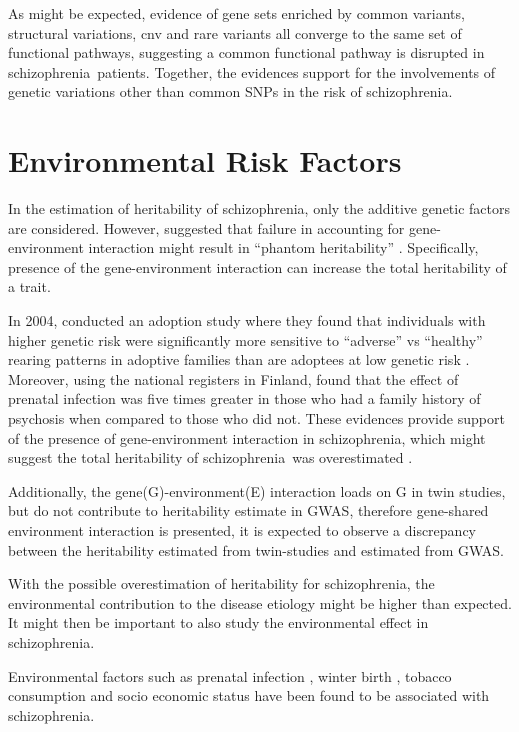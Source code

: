 \documentclass[12pt]{scrbook}
\newcommand*{\scz}{schizophrenia}
\begin{document}
As might be expected, evidence of gene sets enriched by common variants, structural variations, \gls{cnv} and rare variants all converge to the same set of functional pathways, suggesting a common functional pathway is disrupted in \scz\ patients.
Together, the evidences support for the involvements of genetic variations other than common \glspl{SNP} in the risk of \scz.

\section{Environmental Risk Factors}
In the estimation of heritability of \scz, only the additive genetic factors are considered. 
However, \citet{zuk2012mystery} suggested that failure in accounting for gene-environment interaction might result in ``phantom heritability'' \citep{zuk2012mystery}.
Specifically, presence of the gene-environment interaction can increase the total heritability of a trait.

In 2004, \citet{Tienari2004} conducted an adoption study where they found that individuals with higher genetic risk were significantly more sensitive to ``adverse'' vs ``healthy'' rearing patterns in adoptive families than are adoptees at low genetic risk \citep{Tienari2004}.
Moreover, using the national registers in Finland, \citet{Clarke2009} found that the effect of prenatal infection was five times greater in those who had a family history of psychosis when compared to those who did not. 
These evidences provide support of the presence of gene-environment interaction in \scz, which might suggest the total heritability of \scz\ was overestimated \citep{zuk2012mystery}.

Additionally, the gene(G)-environment(E) interaction loads on G in twin studies, but do not contribute to heritability estimate in \gls{GWAS}, therefore gene-shared environment interaction is presented, it is expected to observe a discrepancy between the heritability estimated from twin-studies and estimated from \gls{GWAS}.

With the possible overestimation of heritability for \scz, the environmental contribution to the disease etiology might be higher than expected. 
It might then be important to also study the environmental effect in \scz.

Environmental factors such as prenatal infection \citep{Brown2010}, winter birth \citep{o1991season}, tobacco consumption \citep{Kelly1999} and socio economic status \citep{mcgrath2008schizophrenia} have been found to be associated with \scz.
\end{document}
